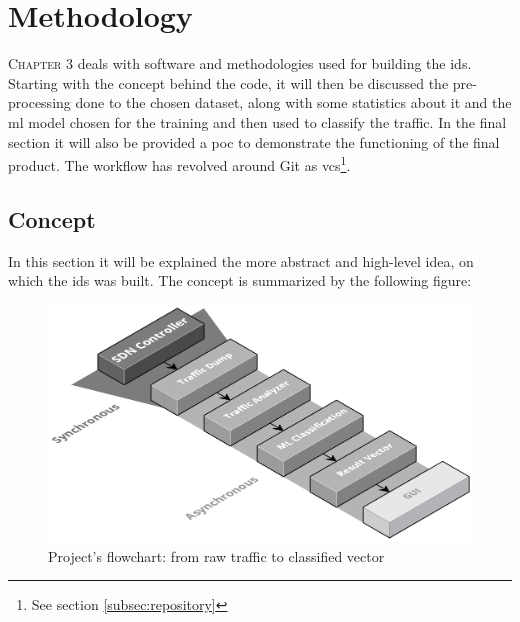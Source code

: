 \chapter{Methodology}
\label{chap:methodology}

\lettrine[lines=4, findent=3pt, nindent=0pt]{C}{hapter} 3 deals with software and methodologies used for building the \gls{ids}. Starting with the concept behind the code, it will then be discussed the pre-processing done to the chosen dataset, along with some statistics about it and the \gls{ml} model chosen for the training and then used to classify the traffic. In the final section it will also be provided a \gls{poc} to demonstrate the functioning of the final product. The workflow has revolved around Git as \gls{vcs}\footnote{See section \ref{subsec:repository}}.


\section{Concept}
\label{sec:concept}

In this section it will be explained the more abstract and high-level idea, on which the \gls{ids} was built. The concept is summarized by the following figure:

\begin{figure}[h!]
    \centering
    \includegraphics[scale=0.32]{assets/figures/chapter3/concept-components.png}
    \caption{Project's flowchart: from raw traffic to classified vector}
    \label{fig:concept-components}
\end{figure}

